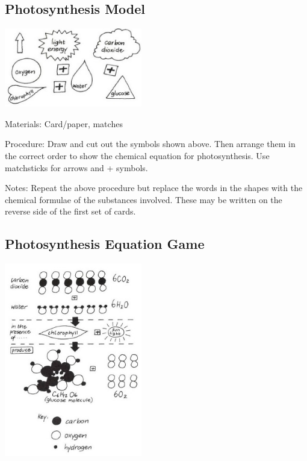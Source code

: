 \begin{multicols}{2}
\subsection{Photosynthesis Model} %

\begin{center}
\includegraphics[width=0.45\textwidth]{./img/vso/photo-model.jpg}
\end{center}

\begin{description*}
\item[Materials:]{Card/paper, matches}
\item[Procedure:]{Draw and cut out the symbols shown above. Then arrange them in the correct order to
show the chemical equation for photosynthesis. Use matchsticks for arrows and + symbols.}
\item[Notes:]{Repeat the above procedure but replace the words in the shapes with the chemical
formulae of the substances involved. These may be written on the reverse side of the first set
of cards.}
\end{description*}

\subsection{Photosynthesis Equation Game} %

\begin{center}
\includegraphics[width=0.45\textwidth]{./img/vso/photo-game.jpg}
\end{center}


\end{multicols}
